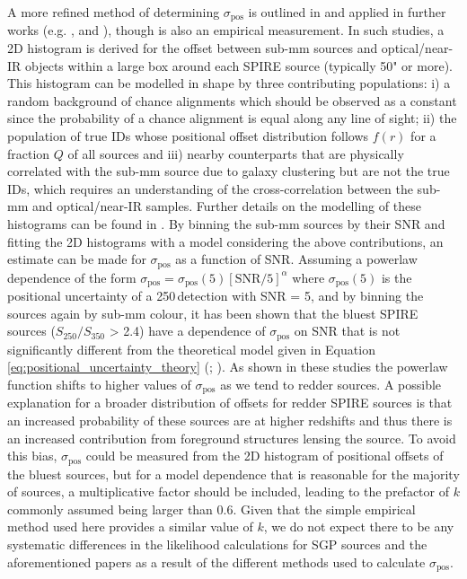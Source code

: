A more refined method of determining $\sigma_{\textrm{pos}}$ is outlined in \citealt{Smith_2011} and applied in further works (e.g. \citealt{Bourne_2014}, \citealt{Bourne_2016} and \citealt{Furlanetto_2018}), though is also an empirical measurement. In such studies, a 2D histogram is derived for the offset between sub-mm sources and optical/near-IR objects within a large box around each SPIRE source (typically 50" or more). This histogram can be modelled in shape by three contributing populations: i) a random background of chance alignments which should be observed as a constant since the probability of a chance alignment is equal along any line of sight; ii) the population of true IDs whose positional offset distribution follows $f(r)$ for a fraction $Q$ of all sources and iii) nearby counterparts that are physically correlated with the sub-mm source due to galaxy clustering but are not the true IDs, which requires an understanding of the cross-correlation between the sub-mm and optical/near-IR samples. Further details on the modelling of these histograms can be found in \citealt{Smith_2011}. By binning the sub-mm sources by their SNR and fitting the 2D histograms with a model considering the above contributions, an estimate can be made for $\sigma_{\textrm{pos}}$ as a function of SNR. Assuming a powerlaw dependence of the form $\sigma_{\textrm{pos}} = \sigma_{\textrm{pos}}(5) [\textrm{SNR}/5]^\alpha$ where $\sigma_{\textrm{pos}}(5)$ is the positional uncertainty of a 250\,\micron detection with SNR = 5, and by binning the sources again by sub-mm colour, it has been shown that the bluest SPIRE sources ($S_{250}/S_{350}$ > 2.4) have a dependence of $\sigma_{\textrm{pos}}$ on SNR that is not significantly different from the theoretical model given in Equation \ref{eq:positional_uncertainty_theory} (\citealt{Bourne_2016}; \citealt{Furlanetto_2018}). As shown in these studies the powerlaw function shifts to higher values of $\sigma_{\textrm{pos}}$ as we tend to redder sources. A possible explanation for a broader distribution of offsets for redder SPIRE sources is that an increased probability of these sources are at higher redshifts and thus there is an increased contribution from foreground structures lensing the source. To avoid this bias, $\sigma_{\textrm{pos}}$ could be measured from the 2D histogram of positional offsets of the bluest sources, but for a model dependence that is reasonable for the majority of sources, a multiplicative factor should be included, leading to the prefactor of $k$ commonly assumed being larger than 0.6. Given that the simple empirical method used here provides a similar value of $k$, we do not expect there to be any systematic differences in the likelihood calculations for SGP sources and the aforementioned papers as a result of the different methods used to calculate $\sigma_{\textrm{pos}}$.

